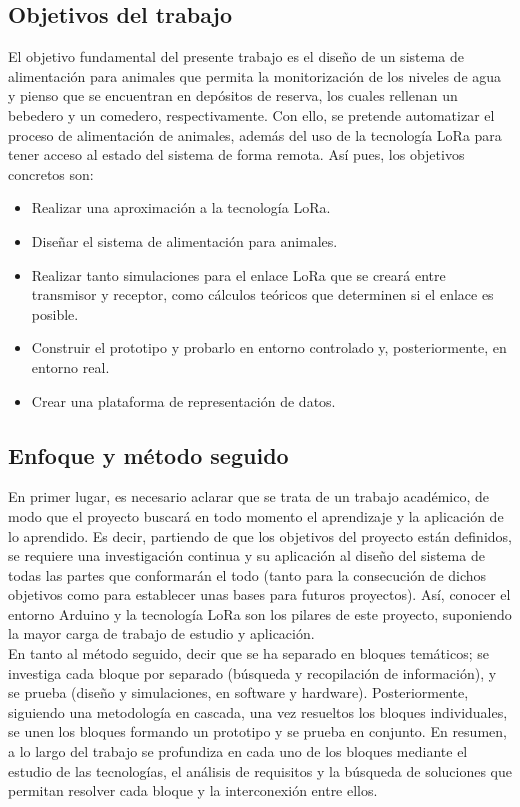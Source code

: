 \documentclass[12pt]{article}
\begin{document}
	\subsection[Objetivos del trabajo]{Objetivos del trabajo}
	\label{subsection: objetivos del trabajo}
	El objetivo fundamental del presente trabajo es el diseño de un sistema de alimentación para animales que permita la monitorización de los niveles de agua y pienso que se encuentran en depósitos de reserva, los cuales rellenan un bebedero y un comedero, respectivamente.  Con ello, se pretende automatizar el proceso de alimentación de animales, además del uso de la tecnología LoRa para tener acceso al estado del sistema de forma remota. Así pues, los objetivos concretos son:
	
	\begin{itemize}
		\item Realizar una aproximación a la tecnología LoRa.
		\item Diseñar el sistema de alimentación para animales.
		\item Realizar tanto simulaciones para el enlace LoRa que se creará entre transmisor y receptor, como cálculos teóricos que determinen si el enlace es posible.
		\item Construir el prototipo y probarlo en entorno controlado y, posteriormente, en entorno real.
		\item Crear una plataforma de representación de datos.
	\end{itemize}
	
	\subsection[Enfoque y método seguido]{Enfoque y método seguido}
	
	\noindent En primer lugar, es necesario aclarar que se trata de un trabajo académico, de modo
que el proyecto buscará en todo momento el aprendizaje y la aplicación de lo aprendido.
 Es decir, partiendo de que los objetivos del proyecto están definidos, se requiere una investigación continua y su aplicación al diseño del sistema de todas las
partes que conformarán el todo (tanto para la consecución de dichos objetivos como para establecer unas bases para futuros proyectos). Así, conocer el entorno Arduino y la tecnología LoRa
son los pilares de este proyecto, suponiendo la mayor carga de trabajo de estudio y
aplicación. \\
	
	\noindent En tanto al método seguido, decir que se ha separado en bloques temáticos; se investiga cada bloque por separado (búsqueda y recopilación de información), y se prueba (diseño y simulaciones, en software y hardware). Posteriormente, siguiendo una metodología en cascada, una vez resueltos los bloques individuales, se unen los bloques formando un prototipo y se prueba en conjunto. En resumen, a lo largo del trabajo se profundiza en cada uno de los bloques mediante el
estudio de las tecnologías, el análisis de requisitos y la búsqueda de soluciones que
permitan resolver cada bloque y la interconexión entre ellos. \\
	
\end{document}

